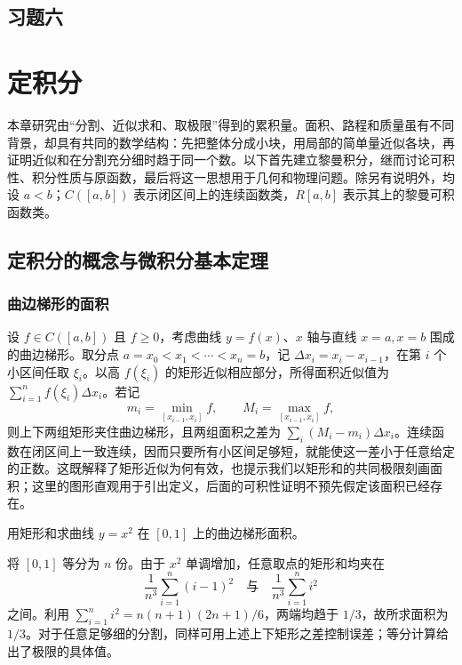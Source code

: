 \documentclass[UTF8,12pt,a4paper,fontset=fandol]{ctexbook}
\begin{document}
\section*{习题六}


\chapter{定积分}
\label{chap:definite-integrals}

本章研究由“分割、近似求和、取极限”得到的累积量。面积、路程和质量虽有不同背景，却具有共同的数学结构：先把整体分成小块，用局部的简单量近似各块，再证明近似和在分割充分细时趋于同一个数。以下首先建立黎曼积分，继而讨论可积性、积分性质与原函数，最后将这一思想用于几何和物理问题。除另有说明外，均设 $a<b$；$C([a,b])$ 表示闭区间上的连续函数类，$R[a,b]$ 表示其上的黎曼可积函数类。

\section{定积分的概念与微积分基本定理}
\label{sec:definite-integrals-and-fundamental-theorem}

\subsection{曲边梯形的面积}
\label{subsec:area-of-curvilinear-trapezoids}

设 $f\in C([a,b])$ 且 $f\geq0$，考虑曲线 $y=f(x)$、$x$ 轴与直线 $x=a,x=b$ 围成的曲边梯形。取分点 $a=x_0<x_1<\cdots<x_n=b$，记 $\Delta x_i=x_i-x_{i-1}$，在第 $i$ 个小区间任取 $\xi_i$。以高 $f(\xi_i)$ 的矩形近似相应部分，所得面积近似值为 $\sum_{i=1}^n f(\xi_i)\Delta x_i$。若记
\[
    m_i=\min_{[x_{i-1},x_i]}f,\qquad
    M_i=\max_{[x_{i-1},x_i]}f,
\]
则上下两组矩形夹住曲边梯形，且两组面积之差为 $\sum_i(M_i-m_i)\Delta x_i$。连续函数在闭区间上一致连续，因而只要所有小区间足够短，就能使这一差小于任意给定的正数。这既解释了矩形近似为何有效，也提示我们以矩形和的共同极限刻画面积；这里的图形直观用于引出定义，后面的可积性证明不预先假定该面积已经存在。

\begin{example}
\label{ex:riemann-area-square-function}
用矩形和求曲线 $y=x^2$ 在 $[0,1]$ 上的曲边梯形面积。
\end{example}
\begin{solve}
将 $[0,1]$ 等分为 $n$ 份。由于 $x^2$ 单调增加，任意取点的矩形和均夹在
\[
    \frac1{n^3}\sum_{i=1}^n(i-1)^2
    \quad\text{与}\quad
    \frac1{n^3}\sum_{i=1}^n i^2
\]
之间。利用 $\sum_{i=1}^n i^2=n(n+1)(2n+1)/6$，两端均趋于 $1/3$，故所求面积为 $1/3$。对于任意足够细的分割，同样可用上述上下矩形之差控制误差；等分计算给出了极限的具体值。
\end{solve}
\end{document}
